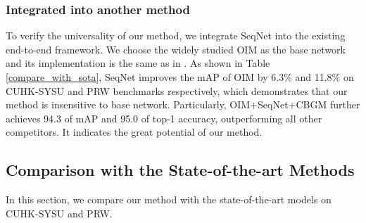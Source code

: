 \documentclass[letterpaper]{article} \usepackage{aaai21}  \usepackage{times}  \usepackage{helvet} \usepackage{courier}  \usepackage[hyphens]{url}  \usepackage{graphicx} \urlstyle{rm} \def\UrlFont{\rm}  \usepackage{natbib}  \usepackage{caption} \usepackage{multirow}
\begin{document}
\subsubsection{Integrated into another method}
To verify the universality of our method, we integrate SeqNet into the existing end-to-end framework. We choose the widely studied OIM \cite{oim} as the base network and its implementation is the same as in \cite{nae}. As shown in Table \ref{compare_with_sota}, SeqNet improves the mAP of OIM by 6.3\% and 11.8\% on CUHK-SYSU and PRW benchmarks respectively, which demonstrates that our method is insensitive to base network. Particularly, OIM+SeqNet+CBGM further achieves 94.3 of mAP and 95.0 of top-1 accuracy, outperforming all other competitors. It indicates the great potential of our method.





















\subsection{Comparison with the State-of-the-art Methods}
In this section, we compare our method with the state-of-the-art models on CUHK-SYSU and PRW.
\end{document}
